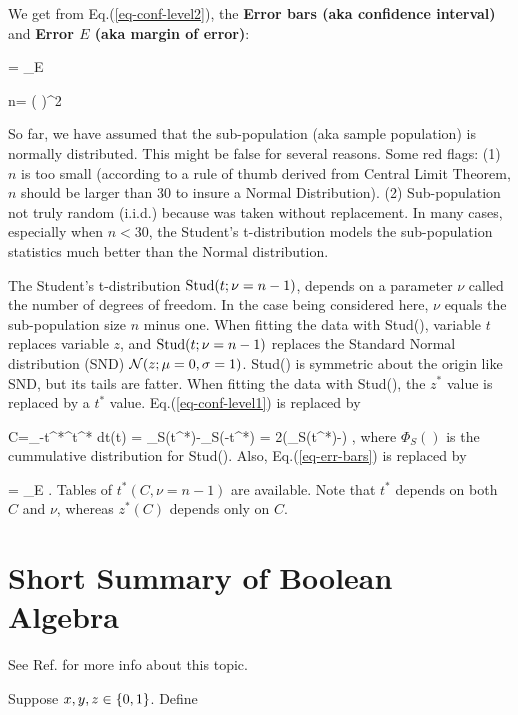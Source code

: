 We get
from Eq.(\ref{eq-conf-level2}),
the {\bf Error bars (aka confidence interval)}
and 
{\bf Error $E$ (aka margin of error)}:



\beq
{} =
 \pm 
{}_{E}
\label{eq-err-bars}
\eeq

\beq
n= \left(
\right)^2
\eeq

So far, we have assumed
that the sub-population (aka sample
population)
is normally distributed.
This might be false
for several reasons.
Some red flags: (1)
$n$ is too small (according to
a rule of thumb derived from
Central Limit Theorem, $n$
should be larger than 30
to insure a Normal Distribution).
(2) Sub-population not truly random 
(i.i.d.) 
because was taken
without replacement.
In many cases,
especially
when $n<30$,
the Student's t-distribution
models the sub-population statistics
much
better than the Normal distribution.


The {\rm Student's t-distribution } ${\rm Stud}(t;
\nu=n-1)$,
depends
on a parameter $\nu$
called the
number of
degrees of freedom.
In the case being considered here,
$\nu$ equals the 
sub-population size $n$
minus one.
When fitting
the data with
Stud(), variable
$t$ replaces
variable $z$,
and ${\rm Stud}(t; \nu=n-1)$
replaces the Standard Normal distribution (SND) 
${\cal N}(z; \mu=0, \sigma=1)$.
Stud() is symmetric about
the origin like SND,
but its tails
are fatter.
When fitting the data with Stud(),
the $z^*$
value is replaced 
by a $t^*$ value.
Eq.(\ref{eq-conf-level1})
is replaced by


\beq
C=\int_{-t^*}^{t^*} dt(t) = 
\Phi_S(t^*)-\Phi_S(-t^*)
=
2\left(\Phi_S(t^*)-\right)
\label{eq-conf-level1-stu}
\;,
\eeq
where $\Phi_S()$
is the cummulative
distribution for  Stud().
Also, Eq.(\ref{eq-err-bars})
is replaced  by

\beq
{} =
 \pm 
{}_{E}
\;.
\eeq
Tables of $t^*(C,\nu=n-1)$
are available. Note 
that $t^*$
depends on both $C$ and $\nu$,
whereas $z^*(C)$
depends only on $C$.


\section{Short Summary of 
Boolean Algebra} 
See Ref.\cite{wiki-bool} for more info
about this topic.

Suppose $x, y, z\in \{0,1\}$. Define

